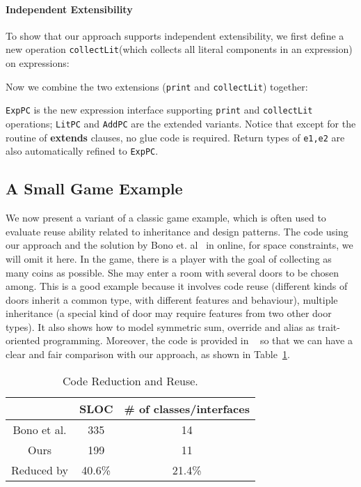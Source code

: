 \paragraph{Independent Extensibility}
To show that our approach supports independent extensibility, we first define a
new operation \texttt{collectLit}(which collects all
literal components in an expression) on expressions: 


\noindent Now we combine the two extensions (\texttt{print} and
\texttt{collectLit}) together:


\noindent \texttt{ExpPC} is the new expression interface supporting
\texttt{print} and \texttt{collectLit} operations; \texttt{LitPC} and
\texttt{AddPC} are the extended variants. Notice that except for the routine of
\textbf{extends} clauses, no glue code is required. Return types of
\texttt{e1,e2} are also automatically refined to \texttt{ExpPC}.

\subsection{A Small Game Example}
We now present a variant of a classic game example, which is often used to
evaluate reuse ability related to inheritance and design patterns. The code
using our approach and the solution by Bono et. al~\cite{bono14} in online, for
space constraints, we will omit it here. In the game, there is a player with the
goal of collecting as many coins as possible. She may enter a room with several
doors to be chosen among. This is a good example because it involves code reuse
(different kinds of doors inherit a common type, with different features and
behaviour), multiple inheritance (a special kind of door may require features
from two other door types). It also shows how to model symmetric sum, override
and alias as trait-oriented programming. Moreover, the code is provided in
~\cite{bono14} so that we can have a clear and fair comparison with our
approach, as shown in Table~\ref{table:codereduction}.

\begin{table}[h]
\centering
\begin{tabular}{ccc}
\hline
            & SLOC   & \# of classes/interfaces \\ \hline
Bono et al. & 335    & 14                       \\
Ours        & 199    & 11                       \\
\rowcolor[HTML]{C0C0C0} 
Reduced by  & 40.6\% & 21.4\%                   \\ \hline
\end{tabular}
\caption{Code Reduction and Reuse.}
\label{table:codereduction}
\end{table}


